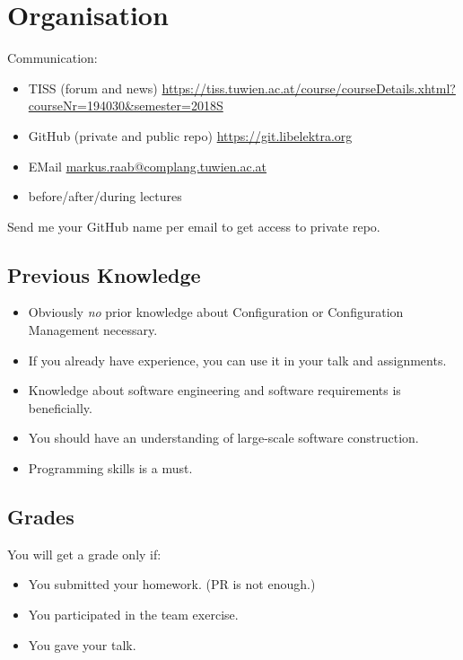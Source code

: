 \documentclass{beamer}
\begin{document}
\section{Organisation}

\begin{frame}
	Communication:
	\begin{itemize}
		\item TISS (forum and news) \url{https://tiss.tuwien.ac.at/course/courseDetails.xhtml?courseNr=194030&semester=2018S}
		\item GitHub (private and public repo) \url{https://git.libelektra.org}
		\item EMail \url{markus.raab@complang.tuwien.ac.at}
		\item before/after/during lectures
	\end{itemize}
\end{frame}

\begin{assignment}
	\begin{task}
	Send me your GitHub name per email to get access to private repo.
	\end{task}
\end{assignment}

\subsection{Previous Knowledge}
\begin{frame}
	\begin{itemize}
		\item Obviously \textit{no} prior knowledge about Configuration or Configuration Management necessary.
		\item If you already have experience, you can use it in your talk and assignments.
		\item Knowledge about software engineering and software requirements is beneficially.
		\item You should have an understanding of large-scale software construction.
		\item Programming skills is a must.
	\end{itemize}
\end{frame}

\subsection{Grades}
\begin{frame}
	You will get a grade only if:
	\begin{itemize}
		\item You submitted your homework. (PR is not enough.)
		\item You participated in the team exercise.
		\item You gave your talk.
	\end{itemize}
\end{frame}
\end{document}
